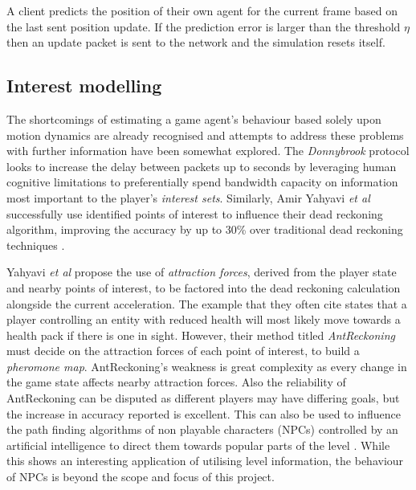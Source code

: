 \documentclass[journal]{IEEEtran}
\begin{document}
\begin{algorithm}
\DontPrintSemicolon %
\caption{A client predicts the position of their own agent for the current frame based on the last sent position update. If the prediction error is larger than the threshold ${\eta}$ then an update packet is sent to the network and the simulation resets itself.}
\label{algo:pseudo}
\end{algorithm}

\subsection{Interest modelling}

The shortcomings of estimating a game agent's behaviour based solely upon motion dynamics are already recognised and attempts to address these problems with further information have been somewhat explored. The \textit{Donnybrook} protocol \cite{bharambe2008donnybrook} looks to increase the delay between packets up to seconds by leveraging human cognitive limitations to preferentially spend bandwidth capacity on information most important to the player's \textit{interest sets}. Similarly, Amir Yahyavi \textit{et al} successfully use identified points of interest to influence their dead reckoning algorithm, improving the accuracy by up to 30\% over traditional dead reckoning techniques \cite{yahyavi2011antreckoning}.

Yahyavi \textit{et al} propose the use of \textit{attraction forces}, derived from the player state and nearby points of interest, to be factored into the dead reckoning calculation alongside the current acceleration. The example that they often cite states that a player controlling an entity with reduced health will most likely move towards a health pack if there is one in sight. However, their method titled \textit{AntReckoning} must decide on the attraction forces of each point of interest, to build a \textit{pheromone map}. AntReckoning's weakness is great complexity as every change in the game state affects nearby attraction forces. Also the reliability of AntReckoning can be disputed as different players may have differing goals, but the increase in accuracy reported is excellent. This can also be used to influence the path finding algorithms of non playable characters (NPCs) controlled by an artificial intelligence to direct them towards popular parts of the level \cite{yahyavi2013interest} \cite{yahyavi2013towards}. While this shows an interesting application of utilising level information, the behaviour of NPCs is beyond the scope and focus of this project.
\end{document}
